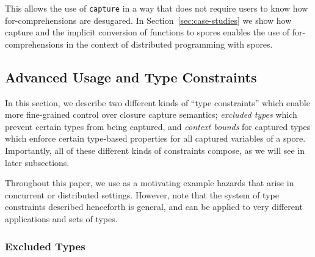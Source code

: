 \documentclass[runningheads]{llncs}
\begin{document}
\begin{sloppypar}
\noindent This allows the use of \verb|capture| in a way that does not require users to
know how for-comprehensions are desugared. In Section~\ref{sec:case-studies}
we show how capture and the implicit conversion of functions to spores enables
the use of for-comprehensions in the context of distributed programming with
spores.







\vspace{2mm}
\subsection{Advanced Usage and Type Constraints}
\label{sec:adv-usage-type-constraints}
\vspace{1mm}

In this section, we describe two different kinds of ``type constraints'' which
enable more fine-grained control over closure capture semantics; \emph{excluded
types} which prevent certain types from being captured, and \emph{context bounds} for
captured types which enforce certain type-based properties for all captured
variables of a spore. Importantly, all of these different kinds of constraints
compose, as we will see in later subsections.


Throughout this paper, we use as a motivating example hazards that arise in
concurrent or distributed settings. However, note that the system of type
constraints described henceforth is general, and can be applied to very
different applications and sets of types.

\subsubsection{Excluded Types}
\label{sec:excluded-types}


\end{sloppypar}
\end{document}
